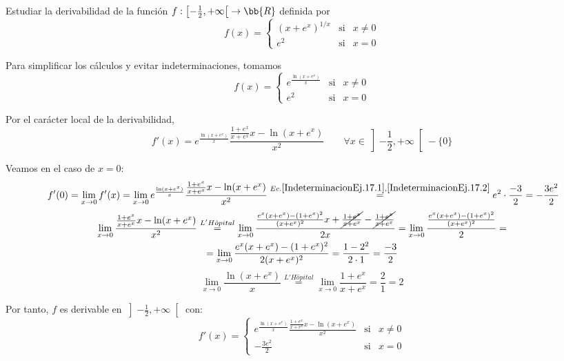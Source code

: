 \begin{ejercicio}
    Estudiar la derivabilidad de la función $f:\left[-\frac{1}{2}, +\infty \right[ \to \bb{R}$ definida por
    $$f(x)=\left\{
    \begin{array}{ccl}
    (x+e^x)^{1/x} & \text{si} & x\neq0 \\
    e^2 & \text{si} & x=0
    \end{array}\right.$$

    Para simplificar los cálculos y evitar indeterminaciones, tomamos
    $$f(x)=\left\{
    \begin{array}{ccl}
    e^{\frac{\ln(x+e^x)}{x}} & \text{si} & x\neq0 \\
    e^2 & \text{si} & x=0
    \end{array}\right.$$

    Por el carácter local de la derivabilidad,
    $$f'(x) = e^{\frac{\ln(x+e^x)}{x}} \frac{\frac{1+e^x}{x+e^x}x - \ln(x+e^x)}{x^2} \qquad \forall x \in \left]-\frac{1}{2}, +\infty \right[ - \{0\}$$

    Veamos en el caso de $x=0$:
    \begin{multline*}\
        f'(0) = \lim_{x\to 0} f'(x) = \lim_{x\to 0} e^{\frac{\ln(x+e^x)}{x}} \frac{\frac{1+e^x}{x+e^x}x - \ln(x+e^x)}{x^2} \stackrel{Ec. \ref{IndeterminacionEj.17.1}, \ref{IndeterminacionEj.17.2}}{=} e^2 \cdot \frac{-3}{2} = -\frac{3e^2}{2}
    \end{multline*}
    \begin{multline}\label{IndeterminacionEj.17.1}
        \lim_{x\to 0} \frac{\frac{1+e^x}{x+e^x}x - \ln(x+e^x)}{x^2} \stackrel{L'H\hat{o}pital}{=}
        \lim_{x\to 0} \frac{\frac{e^x(x+e^x)-(1+e^x)^2}{(x+e^x)^2}x + \cancel{\frac{1+e^x}{x+e^x}} - \cancel{\frac{1+e^x}{x+e^x}}}{2x} =
        \lim_{x\to 0} \frac{\frac{e^x(x+e^x)-(1+e^x)^2}{(x+e^x)^2}}{2} =\\
        = \lim_{x\to 0} \frac{e^x(x+e^x)-(1+e^x)^2}{2(x+e^x)^2} = \frac{1-2^2}{2\cdot 1} = \frac{-3}{2}
    \end{multline}
    \begin{equation}\label{IndeterminacionEj.17.2}
        \lim_{x\to 0} \frac{\ln(x+e^x)}{x} \stackrel{L'H\hat{o}pital}{=} \lim_{x\to 0} \frac{1+e^x}{x+e^x} = \frac{2}{1} = 2 
    \end{equation}

    Por tanto, $f$ es derivable en $\left]-\frac{1}{2}, +\infty \right[$ con:
    $$f'(x)=\left\{
    \begin{array}{ccl}
    e^{\frac{\ln(x+e^x)}{x}} \frac{\frac{1+e^x}{x+e^x}x - \ln(x+e^x)}{x^2} & \text{si} & x\neq0 \\
    -\frac{3e^2}{2} & \text{si} & x=0
    \end{array}\right.$$

\end{ejercicio}

